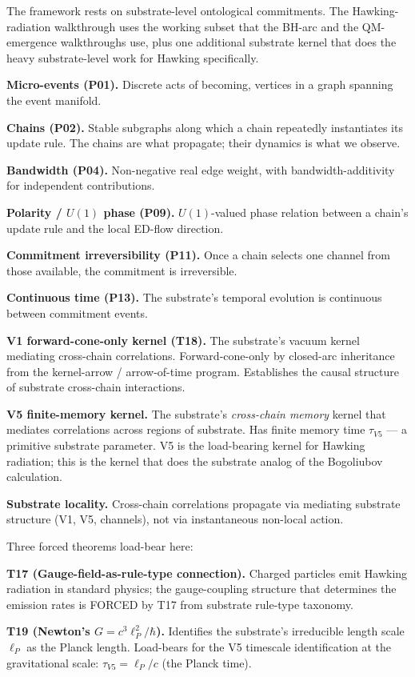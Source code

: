 \documentclass[11pt,a4paper]{article}
\begin{document}
The framework rests on substrate-level ontological commitments. The Hawking-radiation walkthrough uses the working subset that the BH-arc and the QM-emergence walkthroughs use, plus one additional substrate kernel that does the heavy substrate-level work for Hawking specifically.

\textbf{Micro-events (P01).} Discrete acts of becoming, vertices in a graph spanning the event manifold.

\textbf{Chains (P02).} Stable subgraphs along which a chain repeatedly instantiates its update rule. The chains are what propagate; their dynamics is what we observe.

\textbf{Bandwidth (P04).} Non-negative real edge weight, with bandwidth-additivity for independent contributions.

\textbf{Polarity / $U(1)$ phase (P09).} $U(1)$-valued phase relation between a chain's update rule and the local ED-flow direction.

\textbf{Commitment irreversibility (P11).} Once a chain selects one channel from those available, the commitment is irreversible.

\textbf{Continuous time (P13).} The substrate's temporal evolution is continuous between commitment events.

\textbf{V1 forward-cone-only kernel (T18).} The substrate's vacuum kernel mediating cross-chain correlations. Forward-cone-only by closed-arc inheritance from the kernel-arrow / arrow-of-time program. Establishes the causal structure of substrate cross-chain interactions.

\textbf{V5 finite-memory kernel.} The substrate's \emph{cross-chain memory} kernel that mediates correlations across regions of substrate. Has finite memory time $\tau_{V5}$ --- a primitive substrate parameter. V5 is the load-bearing kernel for Hawking radiation; this is the kernel that does the substrate analog of the Bogoliubov calculation.

\textbf{Substrate locality.} Cross-chain correlations propagate via mediating substrate structure (V1, V5, channels), not via instantaneous non-local action.

Three forced theorems load-bear here:

\textbf{T17 (Gauge-field-as-rule-type connection).} Charged particles emit Hawking radiation in standard physics; the gauge-coupling structure that determines the emission rates is FORCED by T17 from substrate rule-type taxonomy.

\textbf{T19 (Newton's $G = c^3 \ell_P^2/\hbar$).} Identifies the substrate's irreducible length scale $\ell_P$ as the Planck length. Load-bears for the V5 timescale identification at the gravitational scale: $\tau_{V5} = \ell_P/c$ (the Planck time).
\end{document}
